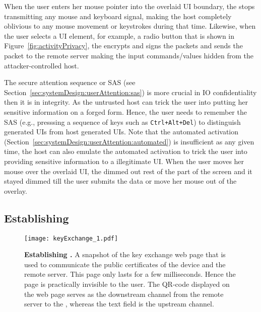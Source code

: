  When the user enters her mouse pointer into the overlaid UI boundary, the \device stops transmitting any mouse and keyboard signal, making the host completely oblivious to any mouse movement or keystrokes during that time. Likewise, when the user selects a UI element, for example, a radio button that is shown in Figure~\ref{fig:activityPrivacy}, the \device encrypts and signs the packets and sends the packet to the remote server making the input commands/values hidden from the attacker-controlled host.

 The secure attention sequence or SAS (see Section~\ref{sec:systemDesign:userAttention:sas}) is more crucial in IO confidentiality then it is in integrity. As the untrusted host can trick the user into putting her sensitive information on a forged form. Hence, the user needs to remember the SAS (e.g., presssing a sequence of keys such as \texttt{Ctrl+Alt+Del}) to distinguish \device generated UIs from host generated UIs. Note that the automated activation (Section~\ref{sec:systemDesign:userAttention:automated}) is insufficient as any given time, the host can also emulate the automated activation to trick the user into providing sensitive information to a illegitimate UI. When the user moves her mouse over the overlaid UI, the \device dimmed out rest of the part of the screen and it stayed dimmed till the user submits the data or move her mouse out of the overlay.


\subsection{Establishing \tls}
\label{sec:confidentiality:tls}

\begin{figure}[t]
\centering
\texttt{[image: keyExchange\_1.pdf]}
\caption{\textbf{Establishing \tls.} A snapshot of the key exchange web page that is used to communicate the public certificates of the device and the remote server. This page only lasts for a few milliseconds. Hence the page is practically invisible to the user. The QR-code displayed on the web page serves as the downstream channel from the remote server to the \device, whereas the text field is the upstream channel.}
\spacesave
\label{fig:keyExchange}
\centering
\end{figure} 

